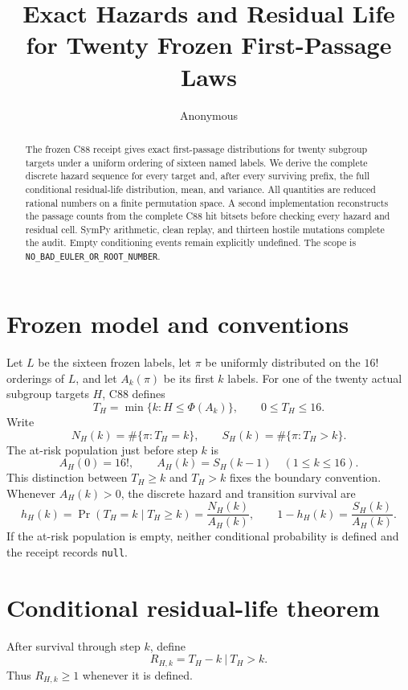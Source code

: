 \documentclass[10pt]{article}
\title{Exact Hazards and Residual Life for Twenty Frozen First-Passage Laws}
\author{Anonymous}
\date{}
\begin{document}
\maketitle

\begin{abstract}
The frozen C88 receipt gives exact first-passage distributions for twenty
subgroup targets under a uniform ordering of sixteen named labels.  We derive
the complete discrete hazard sequence for every target and, after every
surviving prefix, the full conditional residual-life distribution, mean, and
variance.  All quantities are reduced rational numbers on a finite
permutation space.  A second implementation reconstructs the passage counts
from the complete C88 hit bitsets before checking every hazard and residual
cell.  SymPy arithmetic, clean replay, and thirteen hostile mutations complete
the audit.  Empty conditioning events remain explicitly undefined.  The
scope is \texttt{NO\_BAD\_EULER\_OR\_ROOT\_NUMBER}.
\end{abstract}

\section{Frozen model and conventions}
Let $L$ be the sixteen frozen labels, let $\pi$ be uniformly distributed on
the $16!$ orderings of $L$, and let $A_k(\pi)$ be its first $k$ labels.  For
one of the twenty actual subgroup targets $H$, C88 defines
\[
 T_H=\min\{k:H\leq\Phi(A_k)\},\qquad 0\leq T_H\leq16.
\]
Write
\[
 N_H(k)=\#\{\pi:T_H=k\},\qquad
 S_H(k)=\#\{\pi:T_H>k\}.
\]
The at-risk population just before step $k$ is
\[
 A_H(0)=16!,\qquad A_H(k)=S_H(k-1)\quad(1\leq k\leq16).
\]
This distinction between $T_H\geq k$ and $T_H>k$ fixes the boundary
convention.  Whenever $A_H(k)>0$, the discrete hazard and transition survival
are
\[
 h_H(k)=\Pr(T_H=k\mid T_H\geq k)=\frac{N_H(k)}{A_H(k)},\qquad
 1-h_H(k)=\frac{S_H(k)}{A_H(k)}.
\]
If the at-risk population is empty, neither conditional probability is
defined and the receipt records \texttt{null}.

\section{Conditional residual-life theorem}
After survival through step $k$, define
\[
 R_{H,k}=T_H-k\ \big|\ T_H>k.
\]
Thus $R_{H,k}\geq1$ whenever it is defined.
\end{document}
